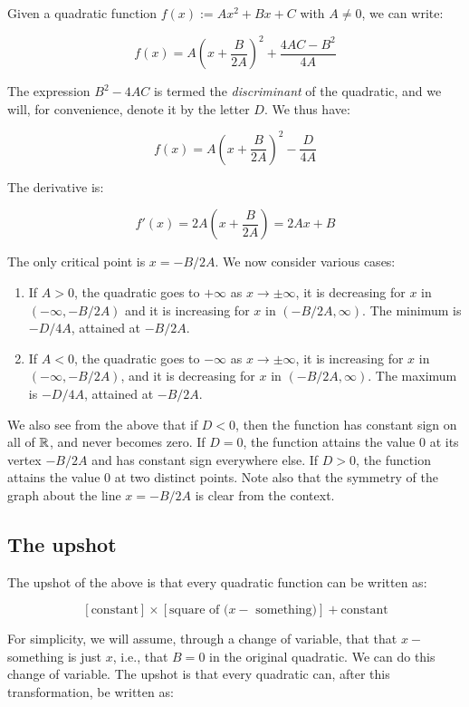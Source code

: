 \documentclass[10pt]{amsart}
\begin{document}
Given a quadratic function $f(x) := Ax^2 + Bx + C$ with $A \ne 0$, we
can write:

$$f(x) = A\left(x + \frac{B}{2A}\right)^2 + \frac{4AC - B^2}{4A}$$

The expression $B^2 - 4AC$ is termed the {\em discriminant} of the
quadratic, and we will, for convenience, denote it by the letter
$D$. We thus have:

$$f(x) = A\left(x + \frac{B}{2A}\right)^2 - \frac{D}{4A}$$

The derivative is:

$$f'(x) = 2A\left(x + \frac{B}{2A}\right) = 2Ax + B$$

The only critical point is $x = -B/2A$. We now consider various cases:

\begin{enumerate}
\item If $A > 0$, the quadratic goes to $+\infty$ as $x \to \pm
  \infty$, it is decreasing for $x$ in $(-\infty,-B/2A)$ and it is
  increasing for $x$ in $(-B/2A,\infty)$. The minimum is $-D/4A$,
  attained at $-B/2A$.
\item If $A < 0$, the quadratic goes to $-\infty$ as $x \to \pm
  \infty$, it is increasing for $x$ in $(-\infty,-B/2A)$, and it is
  decreasing for $x$ in $(-B/2A,\infty)$. The maximum is $-D/4A$,
  attained at $-B/2A$.
\end{enumerate}

We also see from the above that if $D < 0$, then the function has
constant sign on all of $\mathbb{R}$, and never becomes zero. If $D = 0$, the
function attains the value $0$ at its vertex $-B/2A$ and has constant
sign everywhere else. If $D > 0$, the function attains the value $0$
at two distinct points. Note also that the symmetry of the graph about
the line $x = -B/2A$ is clear from the context.

\subsection{The upshot}

The upshot of the above is that every quadratic function can be written as:

$$[\text{constant}] \times [\text{square of ($x - $ something)}] + \text{constant}$$

For simplicity, we will assume, through a change of variable, that
that $x - $ something is just $x$, i.e., that $B = 0$ in the original
quadratic. We can do this change of variable. The upshot is that every
quadratic can, after this transformation, be written as:
\end{document}
